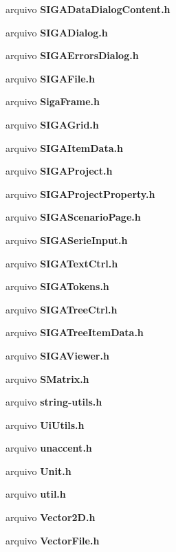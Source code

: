 \begin{DoxyCompactItemize}
arquivo {\bf S\+I\+G\+A\+Data\+Dialog\+Content.\+h}
\item 
arquivo {\bf S\+I\+G\+A\+Dialog.\+h}
\item 
arquivo {\bf S\+I\+G\+A\+Errors\+Dialog.\+h}
\item 
arquivo {\bf S\+I\+G\+A\+File.\+h}
\item 
arquivo {\bf Siga\+Frame.\+h}
\item 
arquivo {\bf S\+I\+G\+A\+Grid.\+h}
\item 
arquivo {\bf S\+I\+G\+A\+Item\+Data.\+h}
\item 
arquivo {\bf S\+I\+G\+A\+Project.\+h}
\item 
arquivo {\bf S\+I\+G\+A\+Project\+Property.\+h}
\item 
arquivo {\bf S\+I\+G\+A\+Scenario\+Page.\+h}
\item 
arquivo {\bf S\+I\+G\+A\+Serie\+Input.\+h}
\item 
arquivo {\bf S\+I\+G\+A\+Text\+Ctrl.\+h}
\item 
arquivo {\bf S\+I\+G\+A\+Tokens.\+h}
\item 
arquivo {\bf S\+I\+G\+A\+Tree\+Ctrl.\+h}
\item 
arquivo {\bf S\+I\+G\+A\+Tree\+Item\+Data.\+h}
\item 
arquivo {\bf S\+I\+G\+A\+Viewer.\+h}
\item 
arquivo {\bf S\+Matrix.\+h}
\item 
arquivo {\bf string-\/utils.\+h}
\item 
arquivo {\bf Ui\+Utils.\+h}
\item 
arquivo {\bf unaccent.\+h}
\item 
arquivo {\bf Unit.\+h}
\item 
arquivo {\bf util.\+h}
\item 
arquivo {\bf Vector2\+D.\+h}
\item 
arquivo {\bf Vector\+File.\+h}
\end{DoxyCompactItemize}
